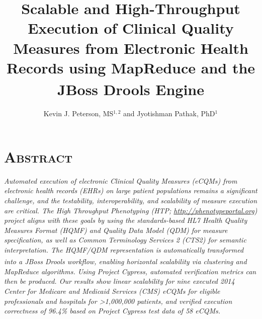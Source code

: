 \documentclass{amia}
\begin{document}
\title{Scalable and High-Throughput Execution of Clinical Quality Measures from Electronic Health Records
using MapReduce and the JBoss\textsuperscript{\textregistered} Drools Engine}

\author{Kevin J. Peterson, MS$^{1,2}$ and Jyotishman Pathak, PhD$^1$}


\maketitle

\section*{\textsc{Abstract}}

\textit{Automated execution of electronic Clinical Quality Measures (eCQMs) from electronic health records (EHRs) on large patient populations remains a significant challenge, and the testability, interoperability, and scalability of measure execution are critical. The High Throughput Phenotyping (HTP; \url{http://phenotypeportal.org}) project aligns with these goals by using the standards-based HL7 Health Quality Measures Format (HQMF) and Quality Data Model (QDM) for measure specification, as well as Common Terminology Services 2 (CTS2) for semantic interpretation. The HQMF/QDM representation is automatically transformed into a JBoss{\textsuperscript{\textregistered}} Drools workflow, enabling horizontal scalability via clustering and MapReduce algorithms. Using Project Cypress, automated verification metrics can then be produced. Our results show linear scalability for nine executed 2014 Center for Medicare and Medicaid Services (CMS) eCQMs for eligible professionals and hospitals for \textgreater1,000,000 patients, and verified execution correctness of 96.4\% based on Project Cypress test data of 58 eCQMs.}
\end{document}
